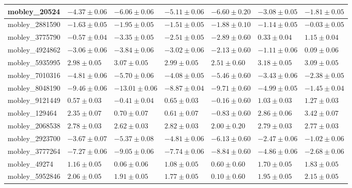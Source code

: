 \documentclass{article}
\begin{document}
\begin{landscape}
\begin{longtable}{|l{3.0cm}|l{3.0cm}|l{3.2cm}|l{3.6cm}|l{3.0cm}|l{3.0cm}|l{3.0cm}|}
mobley\_20524	&	$	-4.37	\pm	0.06	$	&	$	-6.06	\pm	0.06	$	&	$	-5.11	\pm	0.06	$	&	$	-6.60	\pm	0.20	$	&	$	-3.08	\pm	0.05	$	&	$	-1.81	\pm	0.05	$	\\ \hline
mobley\_2881590	&	$	-1.63	\pm	0.05	$	&	$	-1.95	\pm	0.05	$	&	$	-1.51	\pm	0.05	$	&	$	-1.88	\pm	0.10	$	&	$	-1.14	\pm	0.05	$	&	$	-0.03	\pm	0.05	$	\\ \hline
mobley\_3775790	&	$	-0.57	\pm	0.04	$	&	$	-3.35	\pm	0.05	$	&	$	-2.51	\pm	0.05	$	&	$	-2.89	\pm	0.60	$	&	$	0.33	\pm	0.04	$	&	$	1.15	\pm	0.04	$	\\ \hline
mobley\_4924862	&	$	-3.06	\pm	0.06	$	&	$	-3.84	\pm	0.06	$	&	$	-3.02	\pm	0.06	$	&	$	-2.13	\pm	0.60	$	&	$	-1.11	\pm	0.06	$	&	$	0.09	\pm	0.06	$	\\ \hline
mobley\_5935995	&	$	2.98	\pm	0.05	$	&	$	3.07	\pm	0.05	$	&	$	2.99	\pm	0.05	$	&	$	2.51	\pm	0.60	$	&	$	3.18	\pm	0.05	$	&	$	3.09	\pm	0.05	$	\\ \hline
mobley\_7010316	&	$	-4.81	\pm	0.06	$	&	$	-5.70	\pm	0.06	$	&	$	-4.08	\pm	0.05	$	&	$	-5.46	\pm	0.60	$	&	$	-3.43	\pm	0.06	$	&	$	-2.38	\pm	0.05	$	\\ \hline
mobley\_8048190	&	$	-9.46	\pm	0.06	$	&	$	-13.01	\pm	0.06	$	&	$	-8.87	\pm	0.04	$	&	$	-9.71	\pm	0.60	$	&	$	-4.99	\pm	0.05	$	&	$	-1.45	\pm	0.04	$	\\ \hline
mobley\_9121449	&	$	0.57	\pm	0.03	$	&	$	-0.41	\pm	0.04	$	&	$	0.65	\pm	0.03	$	&	$	-0.16	\pm	0.60	$	&	$	1.03	\pm	0.03	$	&	$	1.27	\pm	0.03	$	\\ \hline
mobley\_129464	&	$	2.35	\pm	0.07	$	&	$	0.70	\pm	0.07	$	&	$	0.61	\pm	0.07	$	&	$	-0.83	\pm	0.60	$	&	$	2.86	\pm	0.06	$	&	$	3.42	\pm	0.07	$	\\ \hline
mobley\_2068538	&	$	2.78	\pm	0.03	$	&	$	2.62	\pm	0.03	$	&	$	2.82	\pm	0.03	$	&	$	2.00	\pm	0.20	$	&	$	2.79	\pm	0.03	$	&	$	2.77	\pm	0.03	$	\\ \hline
mobley\_2923700	&	$	-3.67	\pm	0.07	$	&	$	-5.37	\pm	0.08	$	&	$	-4.81	\pm	0.06	$	&	$	-6.13	\pm	0.60	$	&	$	-2.47	\pm	0.06	$	&	$	-1.02	\pm	0.06	$	\\ \hline
mobley\_3777264	&	$	-7.27	\pm	0.06	$	&	$	-9.05	\pm	0.06	$	&	$	-7.74	\pm	0.06	$	&	$	-8.84	\pm	0.60	$	&	$	-4.86	\pm	0.06	$	&	$	-2.68	\pm	0.06	$	\\ \hline
mobley\_49274	&	$	1.16	\pm	0.05	$	&	$	0.06	\pm	0.06	$	&	$	1.08	\pm	0.05	$	&	$	0.60	\pm	0.60	$	&	$	1.70	\pm	0.05	$	&	$	1.83	\pm	0.05	$	\\ \hline
mobley\_5952846	&	$	2.06	\pm	0.05	$	&	$	1.91	\pm	0.05	$	&	$	1.77	\pm	0.05	$	&	$	0.10	\pm	0.60	$	&	$	1.95	\pm	0.05	$	&	$	2.15	\pm	0.05	$	\\ \hline

\end{longtable}
\end{landscape}
\end{document}

